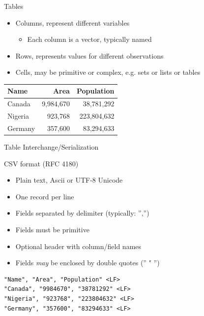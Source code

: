 \documentclass[ignorenonframetext,xcolor=x11names]{beamer}
\begin{document}
\begin{frame}{Tables}
\begin{itemize}
	\item Columns, represent different variables
		\begin{itemize}
			\item Each column is a vector, typically named
		\end{itemize}
	\item Rows, represents values for different observations
	\item Cells, may be primitive or complex, e.g. sets or lists or tables
\end{itemize}
\centering
\vspace{5mm}
\renewcommand{\arraystretch}{1.25}

\begin{tabular}{l|r|r} \hline
\textbf{Name} & \textbf{Area} & \textbf{Population} \\ \hline
Canada & 9,984,670 & 38,781,292  \\
Nigeria & 923,768 & 223,804,632 \\
Germany & 357,600 & 83,294,633 \\ \hline
\end{tabular}
\end{frame}

\begin{frame}[fragile]{Table Interchange/Serialization}
\begin{block}{CSV format (RFC 4180)}
\begin{itemize}
	\item Plain text, Ascii or UTF-8 Unicode
	\item One record per line
	\item Fields separated by delimiter (typically: '','')
	\item Fields must be primitive
	\item Optional header with column/field names
	\item Fields \emph{may} be enclosed by double quotes ('' " '')
\end{itemize}
\end{block}

\begin{verbatim}
"Name", "Area", "Population" <LF>
"Canada", "9984670", "38781292" <LF>
"Nigeria", "923768", "223804632" <LF>
"Germany", "357600", "83294633" <LF>
\end{verbatim}
\end{frame}
\end{document}
